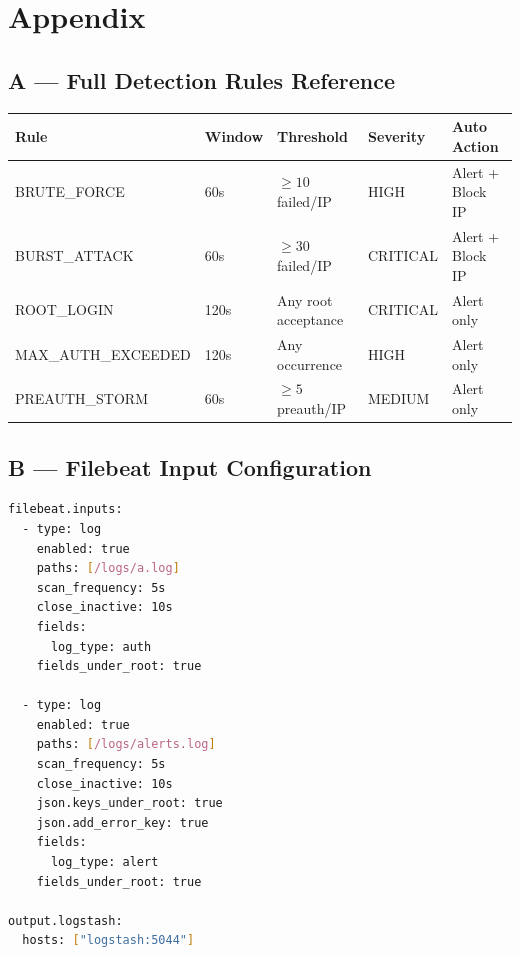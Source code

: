 \documentclass[12pt,a4paper]{article}
\begin{document}
\newpage

\section{Appendix}

\subsection{A — Full Detection Rules Reference}

\begin{center}
\begin{tabular}{p{4cm}p{1.8cm}p{2.8cm}p{2cm}p{3cm}}
  \toprule
  \textbf{Rule} & \textbf{Window} & \textbf{Threshold} & \textbf{Severity} & \textbf{Auto Action} \\
  \midrule
  BRUTE\_FORCE        & 60s  & $\geq 10$ failed/IP   & HIGH     & Alert + Block IP \\
  BURST\_ATTACK       & 60s  & $\geq 30$ failed/IP   & CRITICAL & Alert + Block IP \\
  ROOT\_LOGIN         & 120s & Any root acceptance   & CRITICAL & Alert only \\
  MAX\_AUTH\_EXCEEDED & 120s & Any occurrence        & HIGH     & Alert only \\
  PREAUTH\_STORM      & 60s  & $\geq 5$ preauth/IP   & MEDIUM   & Alert only \\
  \bottomrule
\end{tabular}
\end{center}

\subsection{B — Filebeat Input Configuration}

\begin{lstlisting}[language=bash, caption=filebeat/filebeat.yml]
filebeat.inputs:
  - type: log
    enabled: true
    paths: [/logs/a.log]
    scan_frequency: 5s
    close_inactive: 10s
    fields:
      log_type: auth
    fields_under_root: true

  - type: log
    enabled: true
    paths: [/logs/alerts.log]
    scan_frequency: 5s
    close_inactive: 10s
    json.keys_under_root: true
    json.add_error_key: true
    fields:
      log_type: alert
    fields_under_root: true

output.logstash:
  hosts: ["logstash:5044"]
\end{lstlisting}
\end{document}
